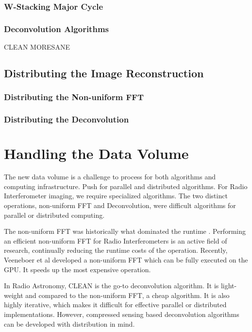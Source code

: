 \subsubsection{W-Stacking Major Cycle}

\subsubsection{Deconvolution Algorithms}
CLEAN
MORESANE



\subsection{Distributing the Image Reconstruction}
\subsubsection{Distributing the Non-uniform FFT}


\subsubsection{Distributing the Deconvolution}



\section{Handling the Data Volume}\label{volume}
The new data volume is a challenge to process for both algorithms and computing infrastructure. Push for parallel and distributed algorithms. For Radio Interferometer imaging, we require specialized algorithms. The two distinct operations, non-uniform FFT and Deconvolution, were difficult algorithms for parallel or distributed computing.

The non-uniform FFT was historically what dominated the runtime \cite{}. Performing an efficient non-uniform FFT for Radio Interferometers is an active field of research\cite{offringa2014wsclean, pratley2018fast}, continually reducing the runtime costs of the operation. Recently, Veeneboer et al\cite{veenboer2017image} developed a non-uniform FFT which can be fully executed on the GPU. It speeds up the most expensive operation.

In Radio Astronomy, CLEAN is the go-to deconvolution algorithm. It is light-weight and compared to the non-uniform FFT, a cheap algorithm. It is also highly iterative, which makes it difficult for effective parallel or distributed implementations. However, compressed sensing based deconvolution algorithms can be developed with distribution in mind.

